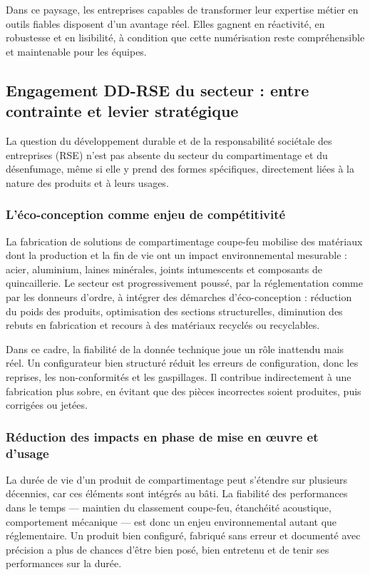 Dans ce paysage, les entreprises capables de transformer leur expertise métier en outils fiables disposent d'un avantage réel. Elles gagnent en réactivité, en robustesse et en lisibilité, à condition que cette numérisation reste compréhensible et maintenable pour les équipes.

\subsection{Engagement DD-RSE du secteur : entre contrainte et levier stratégique}
 
La question du développement durable et de la responsabilité sociétale des entreprises (RSE) n'est pas absente du secteur du compartimentage et du désenfumage, même si elle y prend des formes spécifiques, directement liées à la nature des produits et à leurs usages.
 
\subsubsection{L'éco-conception comme enjeu de compétitivité}
 
La fabrication de solutions de compartimentage coupe-feu mobilise des matériaux dont la production et la fin de vie ont un impact environnemental mesurable : acier, aluminium, laines minérales, joints intumescents et composants de quincaillerie. Le secteur est progressivement poussé, par la réglementation comme par les donneurs d'ordre, à intégrer des démarches d'éco-conception : réduction du poids des produits, optimisation des sections structurelles, diminution des rebuts en fabrication et recours à des matériaux recyclés ou recyclables.
 
Dans ce cadre, la fiabilité de la donnée technique joue un rôle inattendu mais réel. Un configurateur bien structuré réduit les erreurs de configuration, donc les reprises, les non-conformités et les gaspillages. Il contribue indirectement à une fabrication plus sobre, en évitant que des pièces incorrectes soient produites, puis corrigées ou jetées.
 
\subsubsection{Réduction des impacts en phase de mise en œuvre et d'usage}
 
La durée de vie d'un produit de compartimentage peut s'étendre sur plusieurs décennies, car ces éléments sont intégrés au bâti. La fiabilité des performances dans le temps — maintien du classement coupe-feu, étanchéité acoustique, comportement mécanique — est donc un enjeu environnemental autant que réglementaire. Un produit bien configuré, fabriqué sans erreur et documenté avec précision a plus de chances d'être bien posé, bien entretenu et de tenir ses performances sur la durée.
 
